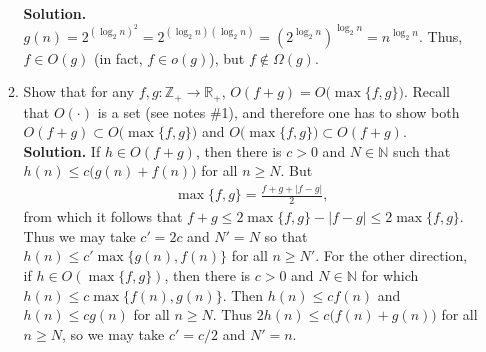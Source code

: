 \documentclass[11pt]{article}
\newcommand{\R}{\mathbb{R}}
\newcommand{\Z}{\mathbb{Z}}
\newcommand{\N}{\mathbb{N}}
\begin{document}
\begin{enumerate}
\begin{enumerate}
\textbf{Solution.} $g(n) = 2^{(\log_{2} n)^{2}} = 2^{(\log_{2} n)(\log_{2} n)} = 
\left(2^{\log_{2} n}\right)^{\log_{2}n} = n^{\log_{2} n}$. Thus, $f \in O(g)$ (in fact, $f \in o(g)$), but $f \notin \Omega(g)$.

\item Show that for any $f,g: \Z_{+} \to \R_{+}$, $O(f+g) = O\bigl(\max\{f,g\}\bigr)$. Recall that $O(\cdot)$ is a set (see notes \#1), and therefore one has to show both $O(f+g) \subset O\bigl(\max\{f,g\}\bigr )$ and $O\bigl (\max\{f,g\} \bigr ) \subset O(f+g)$. \\

\textbf{Solution.} If $h \in  O(f+g)$, then there is $c > 0$ and $N \in \N$ such that $h(n) \leq c\bigl(g(n) + f(n)\bigr)$ for all $n \geq N$. But 
\begin{align*}
  \max\{f,g\} = \frac{f+g + |f-g|}{2},
\end{align*}
from which it follows that $f+g \leq 2 \max\{f,g\}-|f-g| \leq 2 \max\{f,g\}$. Thus we may take $c'=2c$ and $N'=N$ so that $h(n) \leq c' \max\{g(n), f(n)\}$ for all $n \geq N'$. For the other direction, if $h \in O(\max\{f,g\})$, then there is $c > 0$ and $N \in \N$ for which $h(n) \leq c \max\{f(n),g(n)\}$. Then $h(n) \leq c f(n)$ and $h(n) \leq c g(n)$ for all $n \geq N$. Thus $2h(n) \leq c \bigl ( f(n) + g(n) \bigr)$ for all $n \geq N$, so we may take $c' = c/2$ and $N'=n$.



  \end{enumerate}


\end{enumerate}
\end{document}
